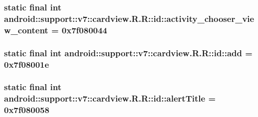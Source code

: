 \hypertarget{classandroid_1_1support_1_1v7_1_1cardview_1_1_r_1_1id_3b36a3849623235e2df6cf538988233a}{
\subsubsection[{activity\_\-chooser\_\-view\_\-content}]{\setlength{\rightskip}{0pt plus 5cm}static final int android::support::v7::cardview.R.R::id::activity\_\-chooser\_\-view\_\-content = 0x7f080044}}
\label{classandroid_1_1support_1_1v7_1_1cardview_1_1_r_1_1id_3b36a3849623235e2df6cf538988233a}


\hypertarget{classandroid_1_1support_1_1v7_1_1cardview_1_1_r_1_1id_2a34b2bf6f6e3f85c9c147ae32a471c0}{
\subsubsection[{add}]{\setlength{\rightskip}{0pt plus 5cm}static final int android::support::v7::cardview.R.R::id::add = 0x7f08001e}}
\label{classandroid_1_1support_1_1v7_1_1cardview_1_1_r_1_1id_2a34b2bf6f6e3f85c9c147ae32a471c0}


\hypertarget{classandroid_1_1support_1_1v7_1_1cardview_1_1_r_1_1id_7d433b2b8e05358eb74d43b719e3c904}{
\subsubsection[{alertTitle}]{\setlength{\rightskip}{0pt plus 5cm}static final int android::support::v7::cardview.R.R::id::alertTitle = 0x7f080058}}
\label{classandroid_1_1support_1_1v7_1_1cardview_1_1_r_1_1id_7d433b2b8e05358eb74d43b719e3c904}


